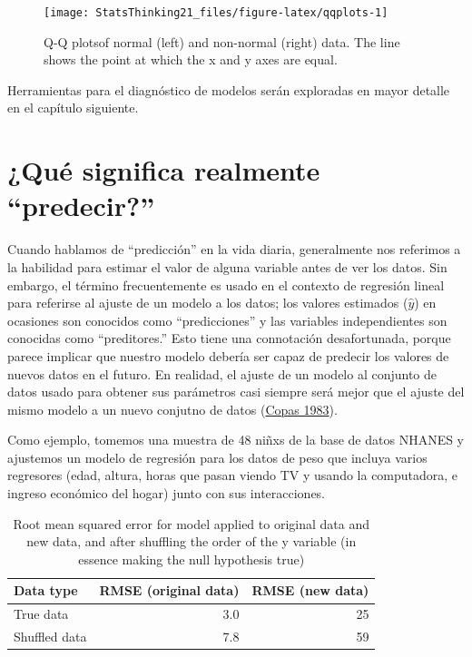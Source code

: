 \documentclass[
  12pt,
]{book}
\theoremstyle{definition}
\theoremstyle{definition}
\theoremstyle{definition}
\theoremstyle{remark}
\begin{document}
\begin{figure}
\texttt{[image: StatsThinking21\_files/figure-latex/qqplots-1]} \caption{Q-Q plotsof normal (left) and non-normal (right) data.  The line shows the point at which the x and y axes are equal.}\label{fig:qqplots}
\end{figure}

Herramientas para el diagnóstico de modelos serán exploradas en mayor detalle en el capítulo siguiente.

\hypertarget{quuxe9-significa-realmente-predecir}{%
\section{¿Qué significa realmente ``predecir?''}\label{quuxe9-significa-realmente-predecir}}

Cuando hablamos de ``predicción'' en la vida diaria, generalmente nos referimos a la habilidad para estimar el valor de alguna variable antes de ver los datos. Sin embargo, el término frecuentemente es usado en el contexto de regresión lineal para referirse al ajuste de un modelo a los datos; los valores estimados (\(\hat{y}\)) en ocasiones son conocidos como ``predicciones'' y las variables independientes son conocidas como ``preditores.'' Esto tiene una connotación desafortunada, porque parece implicar que nuestro modelo debería ser capaz de predecir los valores de nuevos datos en el futuro. En realidad, el ajuste de un modelo al conjunto de datos usado para obtener sus parámetros casi siempre será mejor que el ajuste del mismo modelo a un nuevo conjutno de datos (\protect\hyperlink{ref-copa:1983}{Copas 1983}).

Como ejemplo, tomemos una muestra de 48 niñxs de la base de datos NHANES y ajustemos un modelo de regresión para los datos de peso que incluya varios regresores (edad, altura, horas que pasan viendo TV y usando la computadora, e ingreso económico del hogar) junto con sus interacciones.

\begin{table}

\caption{\label{tab:unnamed-chunk-105}Root mean squared error for model applied to original data and new data, and after shuffling the order of the y variable (in essence making the null hypothesis true)}
\centering
\begin{tabular}[t]{l|r|r}
\hline
Data type & RMSE (original data) & RMSE (new data)\\
\hline
True data & 3.0 & 25\\
\hline
Shuffled data & 7.8 & 59\\
\hline
\end{tabular}
\end{table}
\end{document}
